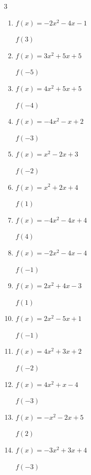 \begin{multicols}{3}
\begin{enumerate}
  \item $f(x)=-2x^{2}-4x-1$

$f(3)$
        \phantom{$= -31$}

  \item $f(x)=3x^{2}+5x+5$

$f(-5)$
        \phantom{$= 55$}

  \item $f(x)=4x^{2}+5x+5$

$f(-4)$
        \phantom{$= 49$}

\columnbreak %

  \item $f(x)=-4x^{2}-x+2$

$f(-3)$
        \phantom{$= -31$}

  \item $f(x)=x^{2}-2x+3$

$f(-2)$
        \phantom{$= 11$}

  \item $f(x)=x^{2}+2x+4$

$f(1)$
        \phantom{$= 7$}

  \item $f(x)=-4x^{2}-4x+4$

$f(4)$
        \phantom{$= -76$}

  \item $f(x)=-2x^{2}-4x-4$

$f(-1)$
        \phantom{$= -2$}

  \item $f(x)=2x^{2}+4x-3$

$f(1)$
        \phantom{$= 3$}

  \item $f(x)=2x^{2}-5x+1$

$f(-1)$
        \phantom{$= 8$}

  \item $f(x)=4x^{2}+3x+2$

$f(-2)$
        \phantom{$= 12$}

  \item $f(x)=4x^{2}+x-4$

$f(-3)$
        \phantom{$= 29$}

  \item $f(x)=-x^{2}-2x+5$

$f(2)$
        \phantom{$= -3$}

  \item $f(x)=-3x^{2}+3x+4$

$f(-3)$
        \phantom{$= -32$}


\end{enumerate}
\end{multicols}
